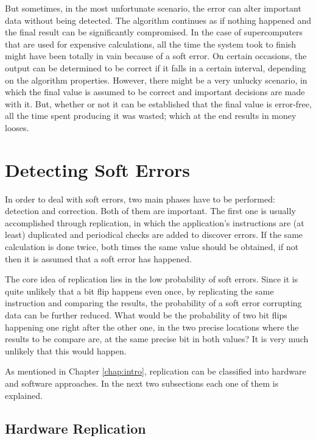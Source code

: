 But sometimes, in the most unfortunate scenario, the error can alter important data without being detected. The algorithm continues as if nothing happened and the final result can be significantly compromised. In the case of supercomputers that are used for expensive calculations, all the time the system took to finish might have been totally in vain because of a soft error. On certain occasions, the output can be determined to be correct if it falls in a certain interval, depending on the algorithm properties. However, there might be a very unlucky scenario, in which the final value is assumed to be correct and important decisions are made with it.  But, whether or not it can be established that the final value is error-free, all the time spent producing it was wasted; which at the end results in money looses. 

\section{Detecting Soft Errors}
\label{sec:detectingSoftErrors}

In order to deal with soft errors, two main phases have to be performed: detection and correction. Both of them are important. The first one is usually accomplished through replication, in which the application's instructions are (at least) duplicated and periodical checks are added to discover errors. If the same calculation is done twice, both times the same value should be obtained, if not then it is assumed that a soft error has happened. 

The core idea of replication lies in the low probability of soft errors. Since it is quite unlikely that a bit flip happens even once, by replicating the same instruction and comparing the results, the probability of a soft error corrupting data can be further reduced. What would be the probability of two bit flips happening one right after the other one, in the two precise locations where the results to be compare are, at the same precise bit in both values? It is very much unlikely that this would happen. 

As mentioned in Chapter \ref{chap:intro}, replication can be classified into hardware and software approaches. In the next two subsections each one of them is explained. 

\subsection{Hardware Replication}
\label{subsec:hardwareReplication}

